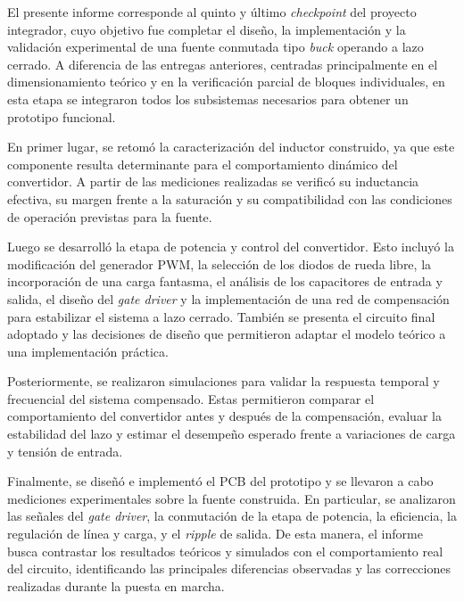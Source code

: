 El presente informe corresponde al quinto y último \textit{checkpoint} del proyecto integrador, cuyo objetivo fue completar el diseño, la implementación y la validación experimental de una fuente conmutada tipo \textit{buck} operando a lazo cerrado. A diferencia de las entregas anteriores, centradas principalmente en el dimensionamiento teórico y en la verificación parcial de bloques individuales, en esta etapa se integraron todos los subsistemas necesarios para obtener un prototipo funcional.

En primer lugar, se retomó la caracterización del inductor construido, ya que este componente resulta determinante para el comportamiento dinámico del convertidor. A partir de las mediciones realizadas se verificó su inductancia efectiva, su margen frente a la saturación y su compatibilidad con las condiciones de operación previstas para la fuente.

Luego se desarrolló la etapa de potencia y control del convertidor. Esto incluyó la modificación del generador PWM, la selección de los diodos de rueda libre, la incorporación de una carga fantasma, el análisis de los capacitores de entrada y salida, el diseño del \textit{gate driver} y la implementación de una red de compensación para estabilizar el sistema a lazo cerrado. También se presenta el circuito final adoptado y las decisiones de diseño que permitieron adaptar el modelo teórico a una implementación práctica.

Posteriormente, se realizaron simulaciones para validar la respuesta temporal y frecuencial del sistema compensado. Estas permitieron comparar el comportamiento del convertidor antes y después de la compensación, evaluar la estabilidad del lazo y estimar el desempeño esperado frente a variaciones de carga y tensión de entrada.

Finalmente, se diseñó e implementó el PCB del prototipo y se llevaron a cabo mediciones experimentales sobre la fuente construida. En particular, se analizaron las señales del \textit{gate driver}, la conmutación de la etapa de potencia, la eficiencia, la regulación de línea y carga, y el \textit{ripple} de salida. De esta manera, el informe busca contrastar los resultados teóricos y simulados con el comportamiento real del circuito, identificando las principales diferencias observadas y las correcciones realizadas durante la puesta en marcha.